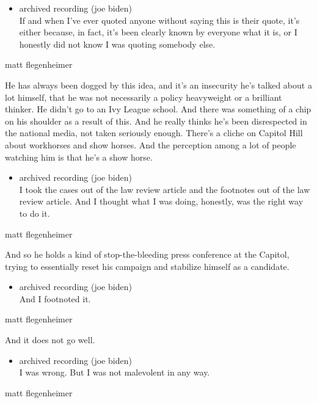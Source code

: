 \begin{itemize}
\tightlist
\item
  archived recording (joe biden)\\
  If and when I've ever quoted anyone without saying this is their
  quote, it's either because, in fact, it's been clearly known by
  everyone what it is, or I honestly did not know I was quoting somebody
  else.
\end{itemize}

matt flegenheimer

He has always been dogged by this idea, and it's an insecurity he's
talked about a lot himself, that he was not necessarily a policy
heavyweight or a brilliant thinker. He didn't go to an Ivy League
school. And there was something of a chip on his shoulder as a result of
this. And he really thinks he's been disrespected in the national media,
not taken seriously enough. There's a cliche on Capitol Hill about
workhorses and show horses. And the perception among a lot of people
watching him is that he's a show horse.

\begin{itemize}
\tightlist
\item
  archived recording (joe biden)\\
  I took the cases out of the law review article and the footnotes out
  of the law review article. And I thought what I was doing, honestly,
  was the right way to do it.
\end{itemize}

matt flegenheimer

And so he holds a kind of stop-the-bleeding press conference at the
Capitol, trying to essentially reset his campaign and stabilize himself
as a candidate.

\begin{itemize}
\tightlist
\item
  archived recording (joe biden)\\
  And I footnoted it.
\end{itemize}

matt flegenheimer

And it does not go well.

\begin{itemize}
\tightlist
\item
  archived recording (joe biden)\\
  I was wrong. But I was not malevolent in any way.
\end{itemize}

matt flegenheimer

